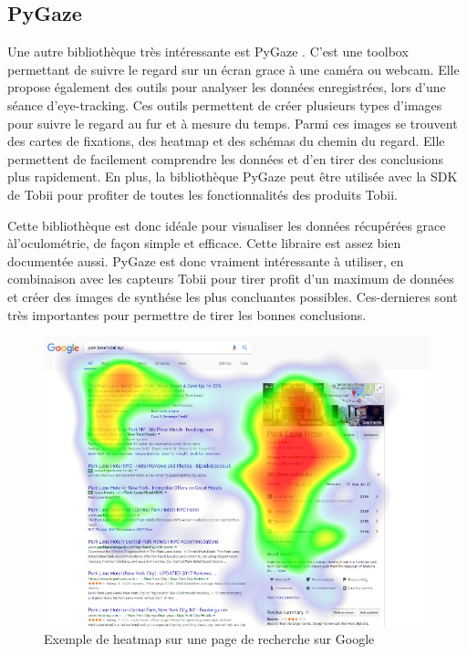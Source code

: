\documentclass[12pt]{article}
\begin{document}
\subsection{PyGaze}

Une autre bibliothèque très intéressante est PyGaze \cite{pygaze}. C'est une
toolbox permettant de suivre le regard sur un écran grace à une caméra ou
webcam. Elle propose également des outils pour analyser les données
enregistrées, lors d'une séance d'eye-tracking. Ces outils permettent de créer
plusieurs types d'images pour suivre le regard au fur et à mesure du temps.
Parmi ces images se trouvent des cartes de fixations, des heatmap et des schémas
du chemin du regard. Elle permettent de facilement comprendre les données et
d'en tirer des conclusions plus rapidement. En plus, la bibliothèque PyGaze peut
être utilisée avec la SDK de Tobii pour profiter de toutes les fonctionnalités
des produits Tobii.

\bigskip
Cette bibliothèque est donc idéale pour visualiser les données récupérées grace
àl'oculométrie, de façon simple et efficace. Cette libraire est assez bien
documentée aussi. PyGaze est donc vraiment intéressante à utiliser, en
combinaison avec les capteurs Tobii pour tirer profit d'un maximum de données
et créer des images de synthése les plus concluantes possibles. Ces-dernieres
sont très importantes pour permettre de tirer les bonnes conclusions.

\begin{figure}[htpb]
  \includegraphics[width=\textwidth,keepaspectratio=true]{heatmap.png}
  \caption{Exemple de heatmap sur une page de recherche sur Google}
\end{figure}
\end{document}
